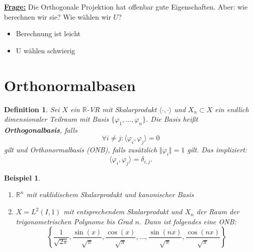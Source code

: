 \documentclass{book}
\newtheorem{definition}[algorithm]{Definition}
\newtheorem{example}[algorithm]{Beispiel}
\def\R{\mathbb{R}}
\begin{document}
            \underline{\textbf{Frage:}} Die Orthogonale Projektion hat offenbar gute Eigenschaften. Aber: wie berechnen wir sie? Wie wählen wir $U$?
            
            \begin{itemize}
                \item Berechnung ist leicht
                \item U wählen schwierig
            \end{itemize}

        \section{Orthonormalbasen}

            \begin{definition}\label{d1.14}
                Sei $X$ ein $\R$-VR mit Skalarprodukt $\langle \cdot,\cdot \rangle$ und
                $X_n\subset X$ ein endlich dimensionaler Teilraum mit Basis $\{\varphi_1,\dots,\varphi_n\}$.
                Die Basis heißt \textbf{Orthogonalbasis}, falls 
                \begin{equation*}
                    \forall i\neq j: \langle \varphi_i,\varphi_j \rangle=0
                \end{equation*}
                gilt und Orthonormalbasis (ONB), falls zusätzlich $\Vert\varphi_i\Vert=1$ gilt. Das impliziert:
                \begin{equation*}
                    \langle \varphi_i,\varphi_j \rangle =\delta_{i,j}.
                \end{equation*}
            \end{definition}

            \begin{example}\label{b1.15}    
                \begin{enumerate}
                    \item $\R^n$ mit euklidischem Skalarprodukt und kanonischer Basis
                    \item $X=L^2(I,1)$ mit entsprechendem Skalarprodukt und $X_n$ der Raum der trigonometrischen Polynome bis Grad $n$.
                    Dann ist folgendes eine ONB:
                    \begin{equation*}
                        \left\{\frac{1}{\sqrt{2\pi}},\frac{\sin(x)}{\sqrt{\pi}},\frac{\cos(x)}{\sqrt{\pi}},\dots,\frac{\sin(nx)}{\sqrt{\pi}},\frac{\cos(nx)}{\sqrt{\pi}}\right\}
                    \end{equation*}
                \end{enumerate}
            \end{example}
\end{document}
